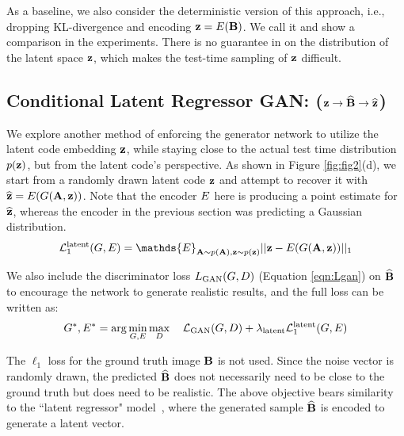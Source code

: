 As a baseline, we also consider the deterministic version of this approach, i.e., dropping KL-divergence and encoding $\mathbf{z}=E(\mathbf{B})$.
We call it \cae and show a comparison in the experiments.
There is no guarantee in \cae on the distribution of the latent space $\mathbf{z}$, which makes the test-time sampling of $\mathbf{z}$ difficult. 

\subsection{Conditional Latent Regressor GAN: \cinfogan ($\mathbf{z} \rightarrow \widehat{\mathbf{B}} \rightarrow \widehat{\mathbf{z}}$)}
We explore another method of enforcing the generator network to utilize the latent code embedding $\mathbf{z}$, while staying close to the actual test time distribution $p(\mathbf{z})$, but from the latent code's perspective.
As shown in Figure \ref{fig:fig2}(d), we start from a 
randomly drawn latent code $\mathbf{z}$ and attempt to recover it with $\widehat{\mathbf{z}}=E(G(\mathbf{A},\mathbf{z}))$.
Note that the encoder $E$ here is producing a point estimate for $\widehat{\mathbf{z}}$, whereas the encoder in the previous section was predicting a Gaussian distribution.
\begin{equation}
\mathcal{L}_{1}^{\text{latent}}(\G,\E) = \mathds{E}_{\A\sim p(\A),\z\sim p(\z)} ||\z - \E(\G(\A,\z)) ||_1
\label{eqn:L1_lacyc}
\end{equation}

We also include the discriminator loss $L_{\text{GAN}}(G,D)$ (Equation \ref{eqn:Lgan}) on $\widehat{\mathbf{B}}$ to encourage the network to generate realistic results, and the full loss can be written as:
\begin{equation}
G^{*}, E^{*} = \arg\min_{G,E} \max_D \quad \mathcal{L}_{\text{GAN}}(G,D) + \lambda_{\text{latent}} \mathcal{L}_1^{\text{latent}}(G,E)
\label{fig:L}
\end{equation}

The $\ell_1$ loss for the ground truth image $\mathbf{B}$ is not used. Since the noise vector is randomly drawn, the predicted $\widehat{\mathbf{B}}$ does not necessarily need to be close to the ground truth but does need to be realistic. The above objective bears similarity to the ``latent regressor" model~\citep{donahue2016adversarial,dumoulin2016adversarially,xi2016infogan}, where the generated sample $\widehat{\mathbf{B}}$ is encoded to generate a latent vector.

